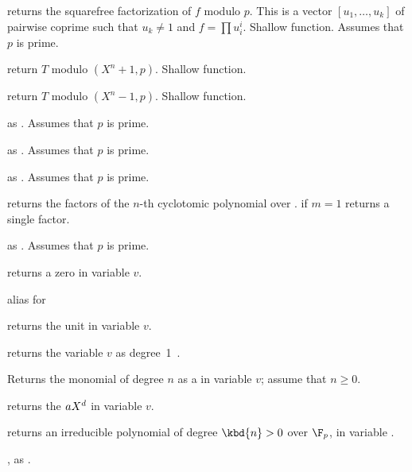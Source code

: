 
 returns the squarefree
factorization of $f$ modulo $p$. This is a vector $[u_1,\dots,u_k]$
of pairwise coprime  such that $u_k \neq 1$ and $f = \prod u_i^i$.
Shallow function. Assumes that $p$ is prime.


 return $T$ modulo
$(X^n + 1, p)$. Shallow function.

 return $T$ modulo
$(X^n - 1, p)$. Shallow function.

 as . Assumes that $p$
is prime.

 as
. Assumes that $p$ is prime.

 as .
Assumes that $p$ is prime.

 returns the factors
of the $n$-th cyclotomic polynomial over . if $m=1$ returns
a single factor.

 as .
Assumes that $p$ is prime.


 returns a zero  in variable $v$.

 alias for 

 returns the unit  in variable $v$.

 returns the variable $v$ as degree~1~.

 Returns the monomial of degree $n$ as
a  in variable $v$; assume that $n \geq 0$.

 returns the 
$a\*X^d$ in variable $v$.

 returns an irreducible
polynomial of degree $\kbd{n} > 0$ over $\F_p$, in variable .

, as .

